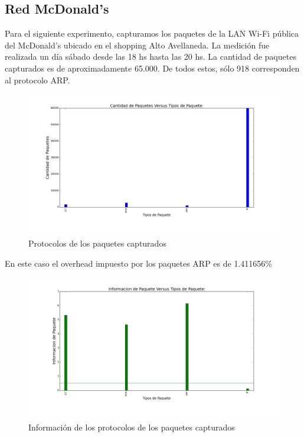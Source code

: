 \subsection{Red McDonald's}

Para el siguiente experimento, capturamos los paquetes de la LAN Wi-Fi pública del McDonald's ubicado en el shopping Alto Avellaneda. La medición fue realizada un día sábado desde las 18 hs hasta las 20 hs. La cantidad de paquetes capturados es de aproximadamente 65.000. De todos estos, sólo 918 corresponden al protocolo ARP.

\begin{figure}[H]
       \centering
       \includegraphics[width=1\textwidth]{../resultados/McDonalds/histogram_types.png}
       \caption{Protocolos de los paquetes capturados}
       \label{red-hogarena-types}
\end{figure}

En este caso el overhead impuesto por los paquetes ARP es de 1.411656\%

\begin{figure}[H]
       \centering
       \includegraphics[width=1\textwidth]{../resultados/McDonalds/histogram_types_information.png}
       \caption{Información de los protocolos de los paquetes capturados}
       \label{red-hogarena-types}
\end{figure}

